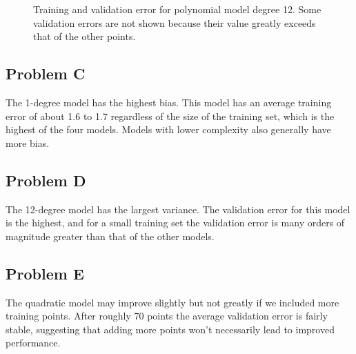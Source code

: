 \documentclass[12pt]{article} %
\begin{document}
\begin{figure}[H]
	\caption{Training and validation error for polynomial model degree 12. Some validation 	errors are not shown because their value greatly exceeds that of the other points.}

\end{figure}

\subsection{Problem C}
The 1-degree model has the highest bias. This model has an average training error of about 1.6 to 1.7 regardless of the size of the training set, which is the highest of the four models. Models with lower complexity also generally have more bias.

\subsection{Problem D}
The 12-degree model has the largest variance. The validation error for this model is the highest, and for a small training set the validation error is many orders of magnitude greater than that of the other models.

\subsection{Problem E}
The quadratic model may improve slightly but not greatly if we included more training points. After roughly 70 points the average validation error is fairly stable, suggesting that adding more points won't necessarily lead to improved performance.
\end{document}
